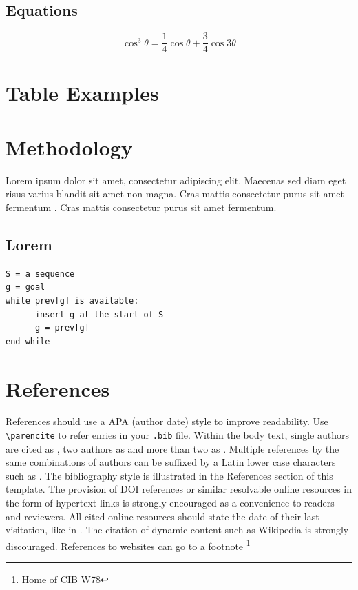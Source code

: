 \subsection{Equations}

\begin{equation}
	\cos^3 \theta =\frac{1}{4}\cos\theta+\frac{3}{4}\cos 3\theta
	\label{eq:example}
\end{equation}

\section{Table Examples}

\section{Methodology}
Lorem ipsum dolor sit amet, consectetur adipiscing elit. Maecenas sed diam eget risus varius blandit sit amet non magna. Cras mattis consectetur purus sit amet fermentum \parencite{sample_citation2}.  Cras mattis consectetur purus sit amet fermentum. 

\subsection{Lorem}
\lipsum[2]  %
\begin{lstlisting}[caption={Showing a pseudo-code snippet of Dijkstra’s algorithm}, label=lst_my_code]
S = a sequence
g = goal
while prev[g] is available:
      insert g at the start of S
      g = prev[g]
end while

\end{lstlisting}
\lipsum[2]  %


\section{References}
References should use a APA (author date) style to improve readability. Use \texttt{\textbackslash parencite} to refer enries in your \texttt{.bib} file.  Within the body text, single authors are cited as \parencite{sample_citation2}, two authors as \parencite{proceedins_example2023} and more than two as \parencite{sample_citation1}. Multiple references by the same combinations of authors can be suffixed by a Latin lower case characters such as \parencite{sample_citation2_with_a_same_year}. The bibliography style is illustrated in the References section of this template. The provision of DOI references or similar resolvable online resources in the form of hypertext links is strongly encouraged as a convenience to readers and reviewers. All cited online resources should state the date of their last visitation, like in \parencite{nasa_website2023}. The citation of dynamic content such as Wikipedia is strongly discouraged. References to websites can go to a footnote \footnote{\href{https://www.cibw78.org/}{Home of CIB W78}}

